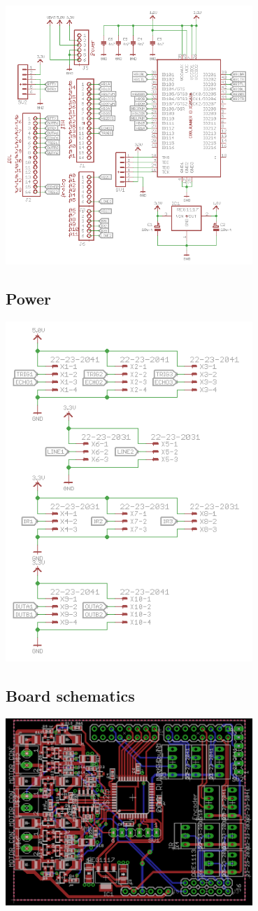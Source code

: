 \includegraphics[width=0.7\textwidth]{figures/CPLD.PNG}

\subsection{Power}

\includegraphics[width=0.7\textwidth]{figures/Power.PNG}

\subsection{Board schematics}
\includegraphics[width=0.7\textwidth]{figures/BoardSche.PNG}